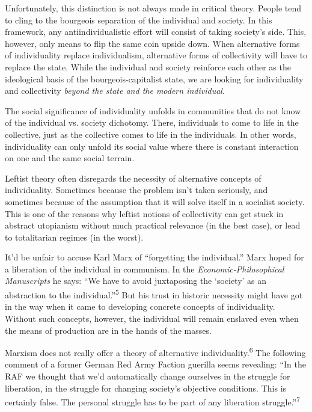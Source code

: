 Unfortunately, this distinction is not always made in critical theory. People
tend to cling to the bourgeois separation of the individual and society. In this
framework, any antiindividualistic effort will consist of taking society’s side.
This, however, only means to flip the same coin upside down. When alternative
forms of individuality replace individualism, alternative forms of collectivity
will have to replace the state. While the individual and society reinforce each
other as the ideological basis of the bourgeois-capitalist state, we are looking
for individuality and collectivity \textit{beyond the state and the modern
individual}.

The social significance of individuality unfolds in communities that do not know
of the individual vs. society dichotomy. There, individuals to come to life in
the collective, just as the collective comes to life in the individuals. In
other words, individuality can only unfold its social value where there is
constant interaction on one and the same social terrain.

Leftist theory often disregards the necessity of alternative concepts of
individuality. Sometimes because the problem isn’t taken seriously, and
sometimes because of the assumption that it will solve itself in a socialist
society. This is one of the reasons why leftist notions of collectivity can get
stuck in abstract utopianism without much practical relevance (in the best
case), or lead to totalitarian regimes (in the worst).

It’d be unfair to accuse Karl Marx of “forgetting the individual.” Marx hoped
for a liberation of the individual in communism. In the
\textit{Economic-Philosophical Manuscripts} he says: “We have to avoid
juxtaposing the ‘society’ as an abstraction to the
individual.”\textsuperscript{5} But his trust in
historic necessity might have got in the way when it came to developing concrete
concepts of individuality. Without such concepts, however, the individual will
remain enslaved even when the means of production are in the hands of the
masses.

Marxism does not really offer a theory of alternative
individuality.\textsuperscript{6} The following comment of a former German Red
Army Faction guerilla seems revealing: “In the RAF we thought that we’d
automatically change ourselves in the struggle for liberation, in the struggle
for changing society’s objective conditions. This is certainly false. The
personal struggle has to be part of any liberation struggle.”\textsuperscript{7}

